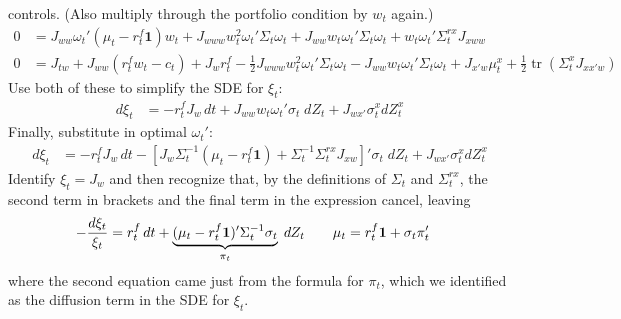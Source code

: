 \documentclass[12pt]{article}
\theoremstyle{plain}
\theoremstyle{definition}
\theoremstyle{remark}
\newcommand{\trace}{\operatorname{tr}}
\begin{document}
controls.
(Also multiply through the portfolio condition by $w_t$ again.)
\begin{align*}
  0
  &=
  J_{ww} \omega_t'(\mu_t-r_t^f\mathbf{1})w_t
  +
  J_{www}
  w_t^2\omega_t'\Sigma_t\omega_t
  +
  J_{ww}
  w_t\omega_t'\Sigma_t\omega_t
  +
  w_t\omega_t'\Sigma_t^{rx}J_{xww}
  \\
  0
  &=
  J_{tw}
  +
  J_{ww}
  (r^f_tw_t -c_t)
  +
  J_{w}
  r^f_t
  -
  \frac{1}{2}
  J_{www}
  w_t^2
  \omega_{t}{}'
  \Sigma_t
  \omega_{t}
  -
  J_{ww}
  w_t
  \omega_{t}{}'
  \Sigma_t
  \omega_{t}
  +
  J_{x'w}
  \mu_t^x
  +
  \frac{1}{2}
  \trace\left(
    \Sigma_t^x
    J_{xx'w}
  \right)
\end{align*}
Use both of these to simplify the SDE for $\xi_t$:
\begin{align*}
  d\xi_t
  &=
  -r^f_t
  J_w
  \,
  dt
  +
  J_{ww}
  w_t
  \omega_{t}'
  \sigma_t
  \;dZ_t
  + J_{wx'}
  \sigma^x_t
  dZ_t^x
\end{align*}
Finally, substitute in optimal $\omega_t'$:
\begin{align*}
  d\xi_t
  &=
  -r_t^f
  J_w
  \,
  dt
  -
  \left[
  J_w
  \Sigma_t^{-1}
  (\mu_t - r^f_t\mathbf{1})
  +
  \Sigma_t^{-1}
  \Sigma_t^{rx}
  J_{xw}
  \right]'
  \sigma_t
  \;dZ_t
  + J_{wx'}
  \sigma^x_t
  dZ_t^x
\end{align*}
Identify $\xi_t=J_w$ and then recognize that, by the definitions of
$\Sigma_t$ and $\Sigma_t^{rx}$, the second term in brackets and the
final term in the expression cancel, leaving
\begin{align*}
  -\frac{d\xi_t}{\xi_t}
  &=
  r_t^f
  \,
  dt
  +
  \underbrace{%
    (\mu_t - r^f_t\mathbf{1})'
    \Sigma_t^{-1}
    \sigma_t
  }_{\pi_t}
  \;dZ_t
  \qquad
  \mu_t
  =
  r_t^f\mathbf{1}+\sigma_t\pi_t'
\end{align*}
where the second equation came just from the formula for $\pi_t$, which
we identified as the diffusion term in the SDE for $\xi_t$.

\clearpage
\end{document}
